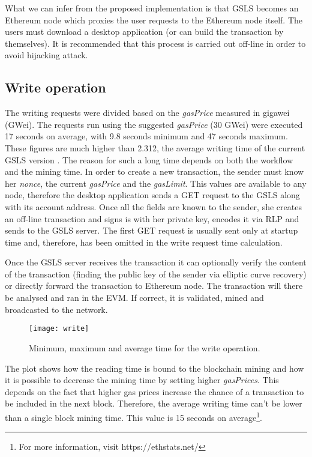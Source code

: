 What we can infer from the proposed implementation is that GSLS becomes an Ethereum node which proxies the user requests to the Ethereum node itself. The users must download a desktop application (or can build the transaction by themselves). It is recommended that this process is carried out off-line in order to avoid hijacking attack.

\subsection{Write operation}

The writing requests were divided based on the \textit{gasPrice} measured in gigawei (GWei). The requests run using the suggested \textit{gasPrice} (30 GWei) were executed 17 seconds on average, with 9.8 seconds minimum and 47 seconds maximum. These figures are much higher than 2.312, the average writing time of the current GSLS version \cite{gondor_distributed_2016}. The reason for such a long time depends on both the workflow and the mining time. 
In order to create a new transaction, the sender must know her \textit{nonce}, the current \textit{gasPrice} and the \textit{gasLimit}. This values are available to any node, therefore the desktop application sends a GET request to the GSLS along with its account address. Once all the fields are known to the sender, she creates an off-line transaction and signs is with her private key, encodes it via RLP and sends to the GSLS server. The first GET request is usually sent only at startup time and, therefore, has been omitted in the write request time calculation. 

Once the GSLS server receives the transaction it can optionally verify the content of the transaction (finding the public key of the sender via elliptic curve recovery) or directly forward the transaction to Ethereum node. The transaction will there be analysed and ran in the EVM. If correct, it is validated, mined and broadcasted to the network.

\begin{figure}[h]
	\centering
  \texttt{[image: write]}
	\caption{Minimum, maximum and average time for the write operation.}
	\label{fig4}
\end{figure}

The plot shows how the reading time is bound to the blockchain mining and how it is possible to decrease the mining time by setting higher \textit{gasPrices}. This depends on the fact that higher gas prices increase the chance of a transaction to be included in the next block. Therefore, the average writing time can't be lower than a single block mining time. This value is 15 seconds on average\footnote{For more information, visit https://ethstats.net/}. 

